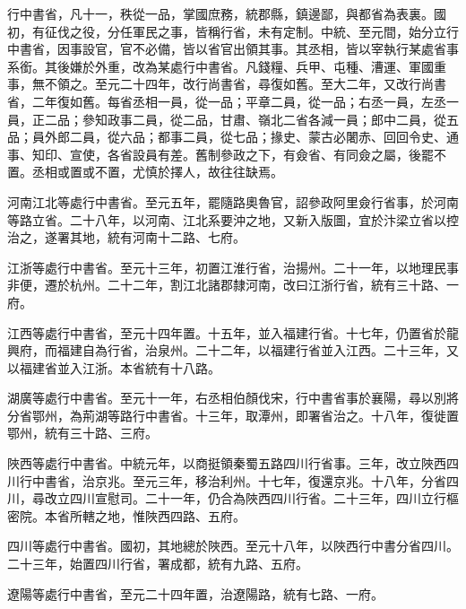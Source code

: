 
\begin{pinyinscope}

 行中書省，凡十一，秩從一品，掌國庶務，統郡縣，鎮邊鄙，與都省為表裏。國初，有征伐之役，分任軍民之事，皆稱行省，未有定制。中統、至元間，始分立行中書省，因事設官，官不必備，皆以省官出領其事。其丞相，皆以宰執行某處省事系銜。其後嫌於外重，改為某處行中書省。凡錢糧、兵甲、屯種、漕運、軍國重事，無不領之。至元二十四年，改行尚書省，尋復如舊。至大二年，又改行尚書省，二年復如舊。每省丞相一員，從一品；平章二員，從一品；右丞一員，左丞一員，正二品；參知政事二員，從二品，甘肅、嶺北二省各減一員；郎中二員，從五品；員外郎二員，從六品；都事二員，從七品；掾史、蒙古必闍赤、回回令史、通事、知印、宣使，各省設員有差。舊制參政之下，有僉省、有同僉之屬，後罷不置。丞相或置或不置，尤慎於擇人，故往往缺焉。



 河南江北等處行中書省。至元五年，罷隨路奧魯官，詔參政阿里僉行省事，於河南等路立省。二十八年，以河南、江北系要沖之地，又新入版圖，宜於汴梁立省以控治之，遂署其地，統有河南十二路、七府。



 江浙等處行中書省。至元十三年，初置江淮行省，治揚州。二十一年，以地理民事非便，遷於杭州。二十二年，割江北諸郡隸河南，改曰江浙行省，統有三十路、一府。



 江西等處行中書省，至元十四年置。十五年，並入福建行省。十七年，仍置省於龍興府，而福建自為行省，治泉州。二十二年，以福建行省並入江西。二十三年，又以福建省並入江浙。本省統有十八路。



 湖廣等處行中書省。至元十一年，右丞相伯顏伐宋，行中書省事於襄陽，尋以別將分省鄂州，為荊湖等路行中書省。十三年，取潭州，即署省治之。十八年，復徙置鄂州，統有三十路、三府。



 陜西等處行中書省。中統元年，以商挺領秦蜀五路四川行省事。三年，改立陜西四川行中書省，治京兆。至元三年，移治利州。十七年，復還京兆。十八年，分省四川，尋改立四川宣慰司。二十一年，仍合為陜西四川行省。二十三年，四川立行樞密院。本省所轄之地，惟陜西四路、五府。



 四川等處行中書省。國初，其地總於陜西。至元十八年，以陜西行中書分省四川。二十三年，始置四川行省，署成都，統有九路、五府。



 遼陽等處行中書省，至元二十四年置，治遼陽路，統有七路、一府。




\end{pinyinscope}
